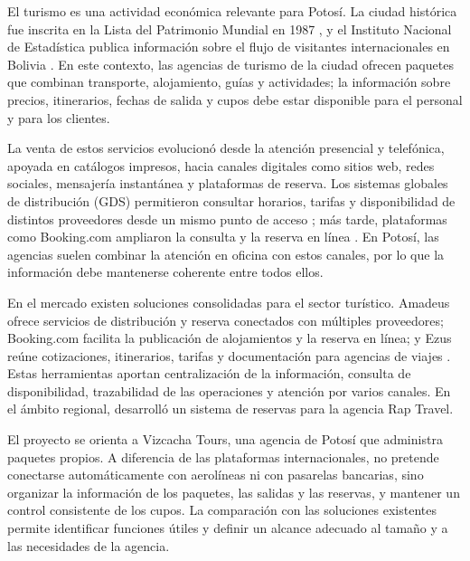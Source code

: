 \label{cap:introduccion}

El turismo es una actividad económica relevante para Potosí. La ciudad
histórica fue inscrita en la Lista del Patrimonio Mundial en 1987
\parencite{unescoPotosi}, y el Instituto Nacional de Estadística publica
información sobre el flujo de visitantes internacionales en Bolivia
\parencite{ineVisitantes}. En este contexto, las agencias de turismo de la
ciudad ofrecen paquetes que combinan transporte, alojamiento, guías y
actividades; la información sobre precios, itinerarios, fechas de salida y
cupos debe estar disponible para el personal y para los clientes.

La venta de estos servicios evolucionó desde la atención presencial y
telefónica, apoyada en catálogos impresos, hacia canales digitales como
sitios web, redes sociales, mensajería instantánea y plataformas de reserva.
Los sistemas globales de distribución (GDS) permitieron consultar horarios,
tarifas y disponibilidad de distintos proveedores desde un mismo punto de
acceso \parencite{amadeusGDS}; más tarde, plataformas como Booking.com
ampliaron la consulta y la reserva en línea \parencite{booking}. En Potosí,
las agencias suelen combinar la atención en oficina con estos canales, por lo
que la información debe mantenerse coherente entre todos ellos.

En el mercado existen soluciones consolidadas para el sector turístico.
Amadeus ofrece servicios de distribución y reserva conectados con múltiples
proveedores; Booking.com facilita la publicación de alojamientos y la reserva
en línea; y Ezus reúne cotizaciones, itinerarios, tarifas y documentación para
agencias de viajes \parencite{ezus}. Estas herramientas aportan
centralización de la información, consulta de disponibilidad, trazabilidad de
las operaciones y atención por varios canales. En el ámbito regional,
\textcite{huaman2017} desarrolló un sistema de reservas para la agencia Rap
Travel.

El proyecto se orienta a Vizcacha Tours, una agencia de Potosí que administra
paquetes propios. A diferencia de las plataformas internacionales, no
pretende conectarse automáticamente con aerolíneas ni con pasarelas
bancarias, sino organizar la información de los paquetes, las salidas y las
reservas, y mantener un control consistente de los cupos. La comparación con
las soluciones existentes permite identificar funciones útiles y definir un
alcance adecuado al tamaño y a las necesidades de la agencia.
